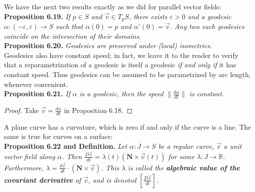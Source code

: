 \documentclass[leqno]{book}
\begin{document}
We have the next two results exactly as we did for parallel vector fields:\\

\noindent\textbf{Proposition 6.19.} \emph{If $p\in S$ and $\vec v\in T_pS$, there exists $\varepsilon>0$ and a geodesic $\alpha:(-\varepsilon,\varepsilon)\to S$ such that $\alpha(0)=p$ and $\alpha'(0)=\vec v$.  Any two such geodesics coincide on the intersection of their domains.}\\

\noindent\textbf{Proposition 6.20.} \emph{Geodesics are preserved under (local) isometries.}\\

\noindent Geodesics also have constant speed; in fact, we leave it to the reader to verify that a reparametrization of a geodesic is itself a geodesic \emph{if and only if} it has constant speed.  Thus geodesics can be assumed to be parametrized by arc length, whenever convenient.\\

\noindent\textbf{Proposition 6.21.} \emph{If $\alpha$ is a geodesic, then the speed $\|\frac{d\alpha}{dt}\|$ is constant.}
\begin{proof}
Take $\vec v=\frac{d\alpha}{dt}$ in Proposition 6.18.
\end{proof}

\noindent A plane curve has a curvature, which is zero if and only if the curve is a line.  The same is true for curves on a surface:\\

\noindent\textbf{Proposition 6.22 and Definition.} \emph{Let $\alpha:J\to S$ be a regular curve, $\vec v$ a unit vector field along $\alpha$.  Then $\frac{D\vec v}{dt}=\lambda(t)(\mathbf N\times\vec v(t))$ for some $\lambda:J\to\mathbb R$.  Furthermore, $\lambda=\frac{d\vec v}{dt}\cdot(\mathbf N\times\vec v)$.  This $\lambda$ is called the \textbf{algebraic value of the covariant derivative} of $\vec v$, and is denoted $\left[\frac{D\vec v}{dt}\right]$.}
\end{document}
